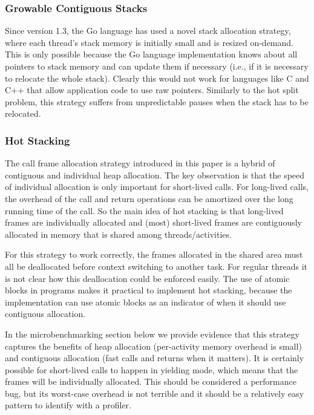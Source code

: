 \documentclass[acmsmall,anonymous,review]{acmart}\settopmatter{printfolios=true,printccs=false,printacmref=false}
\begin{document}

\subsubsection{Growable Contiguous Stacks}

Since version 1.3, the Go language has used a novel stack allocation strategy, where each thread's stack memory is initially small and is resized on-demand.
This is only possible because the Go language implementation knows about all pointers to stack memory and can update them if necessary (i.e., if it is necessary to relocate the whole stack).
Clearly this would not work for languages like C and C++ that allow application code to use raw pointers.
Similarly to the hot split problem, this strategy suffers from unpredictable pauses when the stack has to be relocated.

\subsubsection{Hot Stacking}

The call frame allocation strategy introduced in this paper is a hybrid of contiguous and individual heap allocation.
The key observation is that the speed of individual allocation is only important for short-lived calls.
For long-lived calls, the overhead of the call and return operations can be amortized over the long running time of the call.
So the main idea of hot stacking is that long-lived frames are individually allocated and (most) short-lived frames are contiguously allocated in memory that is shared among threads/activities.

For this strategy to work correctly, the frames allocated in the shared area must all be deallocated before context switching to another task.
For regular threads it is not clear how this deallocation could be enforced easily.
The use of atomic blocks in programs makes it practical to implement hot stacking, because the implementation can use atomic blocks as an indicator of when it should use contiguous allocation.

In the microbenchmarking section below we provide evidence that this strategy captures the benefits of heap allocation (per-activity memory overhead is small) and contiguous allocation (fast calls and returns when it matters).
It is certainly possible for short-lived calls to happen in yielding mode, which means that the frames will be individually allocated.
This should be considered a performance bug, but its worst-case overhead is not terrible and it should be a relatively easy pattern to identify with a profiler.
\end{document}
